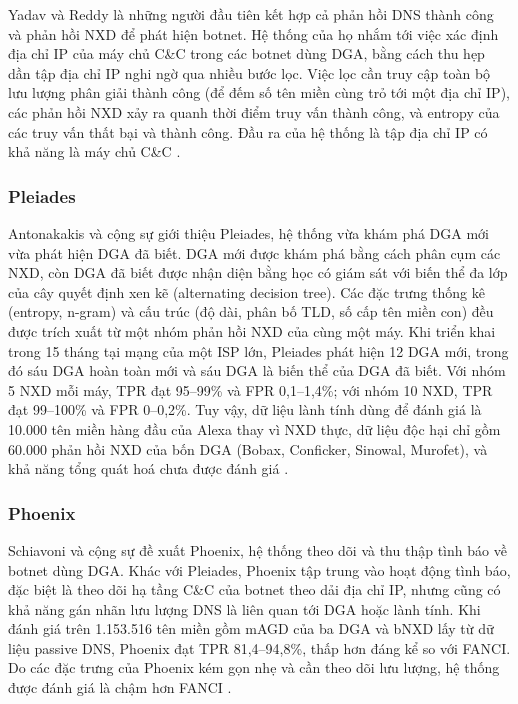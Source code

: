 Yadav và Reddy \cite{yadav2011winning} là những người đầu tiên kết hợp cả phản hồi DNS thành công và phản hồi NXD để phát hiện botnet. Hệ thống của họ nhắm tới việc xác định địa chỉ IP của máy chủ C\&C trong các botnet dùng DGA, bằng cách thu hẹp dần tập địa chỉ IP nghi ngờ qua nhiều bước lọc. Việc lọc cần truy cập toàn bộ lưu lượng phân giải thành công (để đếm số tên miền cùng trỏ tới một địa chỉ IP), các phản hồi NXD xảy ra quanh thời điểm truy vấn thành công, và entropy của các truy vấn thất bại và thành công. Đầu ra của hệ thống là tập địa chỉ IP có khả năng là máy chủ C\&C \cite{schuppen2018fanci}.

\subsubsection{Pleiades}

Antonakakis và cộng sự \cite{antonakakis2012throwaway} giới thiệu Pleiades, hệ thống vừa khám phá DGA mới vừa phát hiện DGA đã biết. DGA mới được khám phá bằng cách phân cụm các NXD, còn DGA đã biết được nhận diện bằng học có giám sát với biến thể đa lớp của cây quyết định xen kẽ (alternating decision tree). Các đặc trưng thống kê (entropy, n-gram) và cấu trúc (độ dài, phân bố TLD, số cấp tên miền con) đều được trích xuất từ một nhóm phản hồi NXD của cùng một máy. Khi triển khai trong 15 tháng tại mạng của một ISP lớn, Pleiades phát hiện 12 DGA mới, trong đó sáu DGA hoàn toàn mới và sáu DGA là biến thể của DGA đã biết. Với nhóm 5 NXD mỗi máy, TPR đạt 95--99\% và FPR 0,1--1,4\%; với nhóm 10 NXD, TPR đạt 99--100\% và FPR 0--0,2\%. Tuy vậy, dữ liệu lành tính dùng để đánh giá là 10.000 tên miền hàng đầu của Alexa thay vì NXD thực, dữ liệu độc hại chỉ gồm 60.000 phản hồi NXD của bốn DGA (Bobax, Conficker, Sinowal, Murofet), và khả năng tổng quát hoá chưa được đánh giá \cite{schuppen2018fanci}.

\subsubsection{Phoenix}

Schiavoni và cộng sự \cite{schiavoni2014phoenix} đề xuất Phoenix, hệ thống theo dõi và thu thập tình báo về botnet dùng DGA. Khác với Pleiades, Phoenix tập trung vào hoạt động tình báo, đặc biệt là theo dõi hạ tầng C\&C của botnet theo dải địa chỉ IP, nhưng cũng có khả năng gán nhãn lưu lượng DNS là liên quan tới DGA hoặc lành tính. Khi đánh giá trên 1.153.516 tên miền gồm mAGD của ba DGA và bNXD lấy từ dữ liệu passive DNS, Phoenix đạt TPR 81,4--94,8\%, thấp hơn đáng kể so với FANCI. Do các đặc trưng của Phoenix kém gọn nhẹ và cần theo dõi lưu lượng, hệ thống được đánh giá là chậm hơn FANCI \cite{schuppen2018fanci}.

